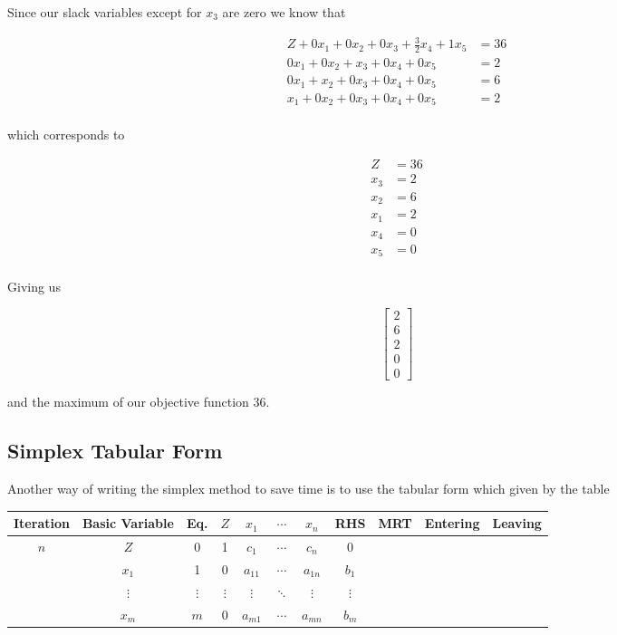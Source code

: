 Since our slack variables except for \(x_3\) are zero we know that

\begin{align*}
	Z + 0x_1 + 0x_2 + 0x_3+ \frac{3}{2}x_4 + 1x_5 & = 36 \\
	0x_1 + 0x_2 + x_3 + 0x_4 + 0x_5               & = 2  \\
	0x_1 + x_2 + 0x_3 + 0x_4 + 0x_5               & = 6  \\
	x_1 + 0x_2 + 0x_3 + 0x_4 + 0x_5               & = 2  \\
\end{align*}

which corresponds to

\begin{align*}
	Z   & = 36 \\
	x_3 & = 2  \\
	x_2 & = 6  \\
	x_1 & = 2  \\
	x_4 & = 0  \\
	x_5 & = 0  \\
\end{align*}


Giving us

\[
	\begin{bmatrix}
		2 \\
		6 \\
		2 \\
		0 \\
		0
	\end{bmatrix}
\]

and the maximum of our objective function 36.

\subsection{Simplex Tabular Form}

Another way of writing the simplex method to save time is to use the tabular form which given by the table

\begin{tabular}{|c|c|c|c|c|c|c|c|c|c|c|}
	\hline
	Iteration & Basic Variable & Eq.        & \(Z\)      & \(x_1\)    & \(\cdots\) & \(x_n\)    & RHS        & MRT & Entering & Leaving \\
	\hline
	\(n\)     & \(Z\)          & 0          & 1          & \(c_1\)    & \(\cdots\) & \(c_n\)    & 0          &     &          &         \\
	          & \(x_1\)        & 1          & 0          & \(a_{11}\) & \(\cdots\) & \(a_{1n}\) & \(b_1\)    &     &          &         \\
	          & \(\vdots\)     & \(\vdots\) & \(\vdots\) & \(\vdots\) & \(\ddots\) & \(\vdots\) & \(\vdots\) &     &          &         \\
	          & \(x_m\)        & \(m\)      & 0          & \(a_{m1}\) & \(\cdots\) & \(a_{mn}\) & \(b_m\)    &     &          &         \\
	\hline
\end{tabular}

